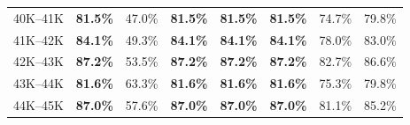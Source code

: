 \begin{table}[h]
\begin{tabular}{lrrrrrrr}
40K--41K & \textbf{81.5\%} & 47.0\% & \textbf{81.5\%} & \textbf{81.5\%} & \textbf{81.5\%} & 74.7\% & 79.8\% \\
41K--42K & \textbf{84.1\%} & 49.3\% & \textbf{84.1\%} & \textbf{84.1\%} & \textbf{84.1\%} & 78.0\% & 83.0\% \\
42K--43K & \textbf{87.2\%} & 53.5\% & \textbf{87.2\%} & \textbf{87.2\%} & \textbf{87.2\%} & 82.7\% & 86.6\% \\
43K--44K & \textbf{81.6\%} & 63.3\% & \textbf{81.6\%} & \textbf{81.6\%} & \textbf{81.6\%} & 75.3\% & 79.8\% \\
44K--45K & \textbf{87.0\%} & 57.6\% & \textbf{87.0\%} & \textbf{87.0\%} & \textbf{87.0\%} & 81.1\% & 85.2\% \\
\bottomrule
\end{tabular}
\end{table}
